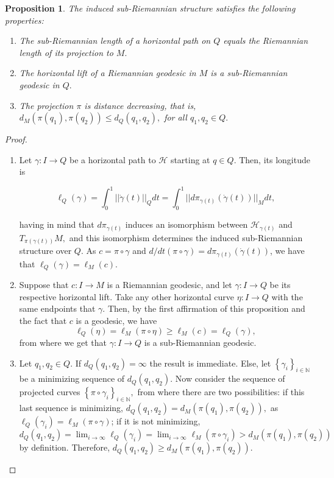 \documentclass[12pt, letterpaper, reqno]{amsart}
\theoremstyle{definition}
\theoremstyle{plain}
\newtheorem{prop}{Proposition}
\theoremstyle{remark}
\providecommand{\DIFdelbegin}{} %
\providecommand{\DIFdelend}{} %
\newcommand{\DIFscaledelfig}{0.5}
\newlength{\DIFdelgraphicswidth} %
\newlength{\DIFdelgraphicsheight} %
\newcommand{\DIFdelincludegraphics}[2][]{%
\sbox{\DIFdelgraphicsbox}{\DIFOincludegraphics[#1]{#2}}%
\settoboxwidth{\DIFdelgraphicswidth}{\DIFdelgraphicsbox} %
\settoboxtotalheight{\DIFdelgraphicsheight}{\DIFdelgraphicsbox} %
\scalebox{\DIFscaledelfig}{%
\parbox[b]{\DIFdelgraphicswidth}{\usebox{\DIFdelgraphicsbox}\\[-\baselineskip] \rule{\DIFdelgraphicswidth}{0em}}\llap{\resizebox{\DIFdelgraphicswidth}{\DIFdelgraphicsheight}{%
\setlength{\unitlength}{\DIFdelgraphicswidth}%
\begin{picture}(1,1)%
\thicklines\linethickness{2pt} %
{\color[rgb]{1,0,0}\put(0,0){\framebox(1,1){}}}%
{\color[rgb]{1,0,0}\put(0,0){\line( 1,1){1}}}%
{\color[rgb]{1,0,0}\put(0,1){\line(1,-1){1}}}%
\end{picture}%
}\hspace*{3pt}}} %
} %
\DeclareRobustCommand{\DIFdelbegin}{\DIFOdelbegin \let\includegraphics\DIFdelincludegraphics} %
\DeclareRobustCommand{\DIFdelend}{\DIFOaddend \let\includegraphics\DIFOincludegraphics} %
\begin{document}
\begin{prop}
	The induced sub-Riemannian structure satisfies the following properties:
	\begin{enumerate}
		\item The sub-Riemannian length of a horizontal path on $ Q $ equals the Riemannian length of its projection to $ M. $ 
		\item The horizontal lift of a Riemannian geodesic in $ M $ is a sub-Riemannian geodesic in $ Q. $ 
		\item The projection $ \pi $ is distance decreasing, that is, $ d_M(\pi(q_1), \pi(q_2))\leq d_Q(q_1,q_2), $ for all $ q_1,q_2\in Q. $ 
	\end{enumerate}
\end{prop}
\begin{proof}
	\begin{enumerate}
		\item Let $ \gamma: I \rightarrow {Q} $ be a horizontal path to $ \mathcal{H} $ starting at $ q\in Q. $ Then, its longitude is 

		$$\ell_Q(\gamma) = \int_0^1 ||\dot{\gamma} (t) ||_{Q} dt = \int_0^1 || d\pi_{\gamma(t)}(\dot{\gamma}(t))||_M dt,$$ 
		\DIFdelbegin %

\DIFdelend having in mind that $d\pi_{\gamma(t)}$ induces an isomorphism between $ \mathcal{H}_{\gamma(t)} $ and $ T_{\pi(\gamma(t))} M,$ and this isomorphism determines the induced sub-Riemannian structure over $ Q. $ As $c=\pi\circ\gamma$ and $ d/dt(\pi\circ\gamma) = d\pi_{\gamma(t)}(\dot{\gamma}(t)) $, we have that $ \ell_Q(\gamma)=\ell_M(c). $  

		\item Suppose that $ c: I \rightarrow {M} $ is a Riemannian geodesic, and let $ \gamma: I \rightarrow {Q} $ be its respective horizontal lift. Take any other horizontal curve $ \eta: I \rightarrow {Q} $ with the same endpoints that $ \gamma. $ Then, by the first affirmation of this proposition and the fact that $ c $ is a geodesic, we have
			$$ \ell_Q(\eta) = \ell_M(\pi\circ \eta) \geq \ell_M(c) = \ell_Q(\gamma),  $$ 
		from where we get that $ \gamma: I \rightarrow {Q} $ is a sub-Riemannian geodesic.

	\item Let $ q_1,q_2\in Q. $ If $ d_Q(q_1,q_2) = \infty $ the result is immediate. Else, let $ \left\{ \gamma_i \right\}_{i\in \mathbb{N}} $ be a minimizing sequence of $ d_Q(q_1,q_2). $ Now consider the sequence of projected curves $ \left\{ \pi\circ\gamma_i \right\}_{i\in \mathbb{N}}, $ from where there are two possibilities: if this last sequence is minimizing, $ d_Q(q_1, q_2) = d_M(\pi(q_1), \pi(q_2)),$ as $ \ell_Q(\gamma_i)=\ell_M(\pi\circ\gamma) $;  if it is not minimizing,  $d_Q(q_1,q_2) = \lim_{i \rightarrow \infty} \ell_Q(\gamma_i) = \lim_{i \rightarrow \infty} \ell_M(\pi\circ\gamma_i) > d_M(\pi(q_1),\pi(q_2))$ by definition. Therefore, $ d_Q(q_1,q_2)\geq d_M(\pi(q_1),\pi(q_2)).$
	\end{enumerate}
\end{proof}
\end{document}
